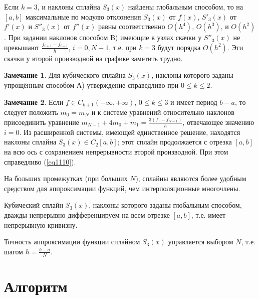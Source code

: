 \documentclass[
11pt,
master, %
subf, %
href, %
colorlinks=true, %
times, %
]{disser}
\begin{document}
Если $k=3$, и наклоны сплайна $S_3(x)$ найдены глобальным способом, то на $[a,b]$ максимальные по модулю отклонения $S_3(x)$ от $f(x)$, $S'_3(x)$ от $f'(x)$  и $S''_3(x)$ от $f''(x)$ равны соответственно $O(h^4)$, $O(h^3)$, и $O(h^2)$. При задании наклонов способом B) имеющие в узлах скачки у $S''_3(x)$ не превышают $\frac{f_{i+1}-f_{i-1}}{h}$, $i=\overline{0,N-1}$, т.е. при $k=3$ будут порядка $O(h^2)$. Эти скачки у второй производной на графике заметить трудно.

\textbf{Замечание 1}. Для кубического сплайна $S_3(x)$, наклоны которого заданы упрощённым способом А) утверждение справедливо при $0\leq k\leq 2$.

\textbf{Замечание 2}. Если $f\in C_{k+1}(-\infty,+\infty)$, $0\leq k\leq 3$ и имеет период $b-a$, то следует положить $m_0=m_N$ и к системе уравнений относительно наклонов присоединить уравнение $m_{N-1}+4m_0+m_1=\frac{3(f_1-f_{N-1})}{h}$, отвечающее значению $i=0$. Из расширенной системы, имеющей единственное решение, находятся наклоны сплайна $S_3(x)\in C_2[a,b]$; этот сплайн продолжается с отрезка $[a,b]$ на всю ось с сохранением непрерывности второй производной. При этом справедливо (\ref{eq1110}).

На больших промежутках (при больших $N$), сплайны являются более удобным средством для аппроксимации функций, чем интерполяционные многочлены.

Кубический сплайн $S_3(x)$, наклоны которого заданы глобальным способом, дважды непрерывно дифференцируем на всем отрезке $[a,b]$, т.е. имеет непрерывную кривизну.

Точность аппроксимации функции сплайном $S_3(x)$ управляется выбором $N$, т.е. шагом $h=\frac{b-a}{N}$.

\newpage
\section{Алгоритм}
\end{document}
